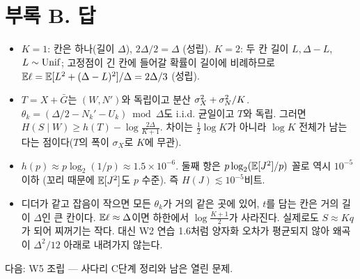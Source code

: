 \section*{부록 B. 답}
\begin{itemize}[leftmargin=2.2em]
\item[D.5] $K=1$: 칸은 하나(길이 $\Delta$), $2\Delta/2=\Delta$ (성립). $K=2$: 두 칸 길이 $L,\Delta-L$, $L\sim\operatorname{Unif}$; 고정점이 긴 칸에 들어갈 확률이 길이에 비례하므로 $\mathbb{E}\ell=\mathbb{E}[L^2+(\Delta-L)^2]/\Delta=2\Delta/3$ (성립).
\item[2.8] $T=X+\bar G$는 $(W,N')$와 독립이고 분산 $\sigma_X^2+\sigma_N^2/K$. $\theta_k=(\Delta/2-N_k'-U_k)\bmod\Delta$도 i.i.d. 균일이고 $T$와 독립. 그러면 $H(S\mid W)\ge h(T)-\log\frac{2\Delta}{K+1}$. 차이는 $\frac12\log K$가 아니라 $\log K$ 전체가 남는다는 점이다($T$의 폭이 $\sigma_X$로 $K$에 무관).
\item[3.5] $h(p)\approx p\log_2(1/p)\approx1.5\times10^{-6}$. 둘째 항은 $p\log_2(\mathbb{E}[J^2]/p)$ 꼴로 역시 $10^{-5}$ 이하 (꼬리 때문에 $\mathbb{E}[J^2]$도 $p$ 수준). 즉 $H(J)\lesssim10^{-5}$비트.
\item[4.1] 디더가 같고 잡음이 작으면 모든 $\theta_k$가 거의 같은 곳에 있어, $t$를 담는 칸은 거의 길이 $\Delta$인 큰 칸이다. $\mathbb{E}\ell\approx\Delta$이면 하한에서 $\log\frac{K+1}2$가 사라진다. 실제로도 $S\approx Kq$가 되어 찌꺼기는 작다. 대신 W2 연습 1.6처럼 양자화 오차가 평균되지 않아 왜곡이 $\Delta^2/12$ 아래로 내려가지 않는다.
\end{itemize}
\vspace{1em}
\small\textcolor{ink!60}{다음: W5 조립 — 사다리 C단계 정리와 남은 열린 문제.}

